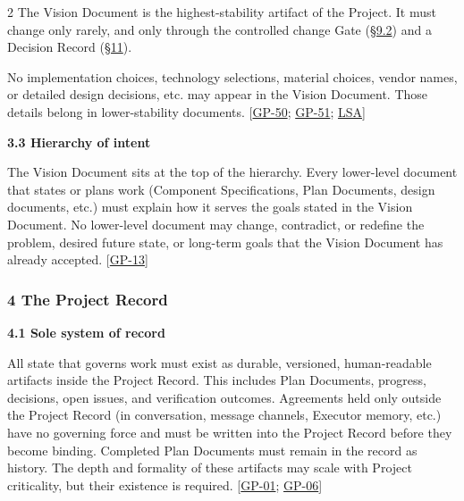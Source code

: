 \begin{multicols}{2}
The Vision Document is the highest-stability artifact of the Project. It must change only rarely, and only through the controlled change Gate (\hyperlink{nss-9.2}{\S9.2}) and a Decision Record (\hyperlink{nss-11}{\S11}).

No implementation choices, technology selections, material choices, vendor names, or detailed design decisions, etc. may appear in the Vision Document. Those details belong in lower-stability documents. [\hyperlink{gp-50}{GP-50}; \hyperlink{gp-51}{GP-51}; \hyperlink{gp-LSA}{LSA}]

\hypertarget{nss-3.3}{}

\par\smallskip\noindent\textbf{3.3 Hierarchy of intent}\par\nopagebreak

The Vision Document sits at the top of the hierarchy. Every lower-level document that states or plans work (Component Specifications, Plan Documents, design documents, etc.) must explain how it serves the goals stated in the Vision Document. No lower-level document may change, contradict, or redefine the problem, desired future state, or long-term goals that the Vision Document has already accepted. [\hyperlink{gp-13}{GP-13}]

\hypertarget{nss-4}{}

\subsubsection*{4 The Project Record}

\hypertarget{nss-4.1}{}

\par\smallskip\noindent\textbf{4.1 Sole system of record}\par\nopagebreak

All state that governs work must exist as durable, versioned, human-readable artifacts inside the Project Record. This includes Plan Documents, progress, decisions, open issues, and verification outcomes. Agreements held only outside the Project Record (in conversation, message channels, Executor memory, etc.) have no governing force and must be written into the Project Record before they become binding. Completed Plan Documents must remain in the record as history. The depth and formality of these artifacts may scale with Project criticality, but their existence is required. [\hyperlink{gp-01}{GP-01}; \hyperlink{gp-06}{GP-06}]

\hypertarget{nss-4.2}{}


\end{multicols}
